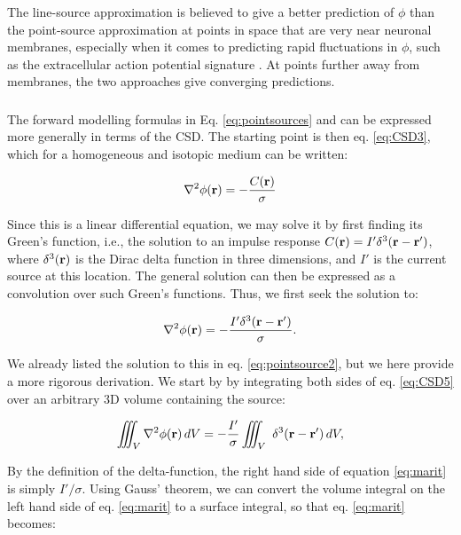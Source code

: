 The line-source approximation is believed to give a better prediction of $\phi$ than the point-source approximation at points in space that are very near neuronal membranes, especially when it comes to predicting rapid fluctuations in $\phi$, such as the extracellular action potential signature \citep{Holt1999}. At points further away from membranes, the two approaches give converging predictions.


\subsubsection{}
The forward modelling formulas in Eq. \ref{eq:pointsources} and \label{eq:linesources} can be expressed more generally in terms of the CSD. The starting point is then eq. \ref{eq:CSD3}, which for a homogeneous and isotopic medium can be written: 

\begin{equation}
\nabla^2 \phi({\bf r}) = - \frac{C({\bf r})}{\sigma}
\label{eq:CSD4}
\end{equation}

Since this is a linear differential equation, we may solve it by first finding its Green's function, i.e., the solution to an impulse response $C({\bf r}) = I' \delta^3({\bf r-r'})$, where $\delta^3({\bf r})$ is the Dirac delta function in three dimensions, and $I'$ is the current source at this location. The general solution can then be expressed as a convolution over such Green's functions. Thus, we first seek the solution to: 

\begin{equation}
\nabla^2 \phi({\bf r}) = - \frac{I' \delta^3({\bf r-r'})}{\sigma}.
\label{eq:CSD5}
\end{equation}

We already listed the solution to this in eq. \ref{eq:pointsource2}, but we here provide a more rigorous derivation. We start by by integrating both sides of eq. \ref{eq:CSD5} over an arbitrary 3D volume containing the source:

\begin{equation}
\iiint_V \nabla^2\phi({\bf r}) \,dV =  - \frac{I'}{\sigma} \iiint_V \ \delta^3({\bf r-r'}) \, dV,
\label{eq:marit}
\end{equation}

By the definition of the delta-function, the right hand side of equation \ref{eq:marit} is simply $I'/\sigma$. Using Gauss' theorem, we can convert the volume integral on the left hand side of eq. \ref{eq:marit} to a surface integral, so that eq. \ref{eq:marit} becomes:

